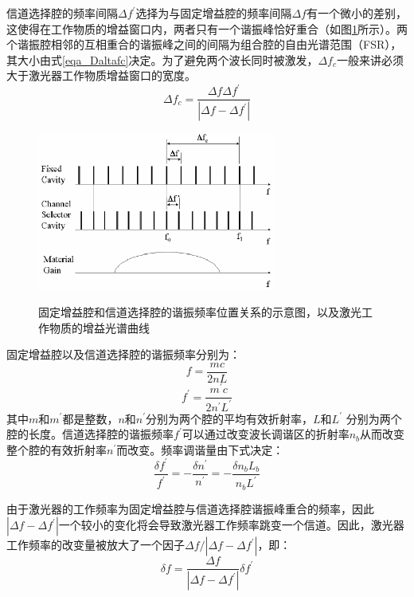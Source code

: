 \documentclass{ZJUthesis}
\begin{document}
信道选择腔的频率间隔$\Delta f ^\prime$选择为与固定增益腔的频率间隔$\Delta f$有一个微小的差别，这使得在工作物质的增益窗口内，两者只有一个谐振峰恰好重合（如图\ref{fig_Deltaf}所示）。两个谐振腔相邻的互相重合的谐振峰之间的间隔为组合腔的自由光谱范围（FSR），其大小由式\ref{eqa_Daltafc}决定。为了避免两个波长同时被激发，$\Delta f_c$一般来讲必须大于激光器工作物质增益窗口的宽度。
\begin{equation}\label{eqa_Daltafc}
  \Delta f_c = \frac{\Delta f \Delta f^\prime}{|\Delta f-\Delta f^\prime|}
\end{equation}
\begin{figure}[!htb]
  \centering
  \includegraphics[width=0.7\textwidth]{./Pictures/deltaf.eps}\\
  \caption{固定增益腔和信道选择腔的谐振频率位置关系的示意图，以及激光工作物质的增益光谱曲线}
  \label{fig_Deltaf}
\end{figure}

固定增益腔以及信道选择腔的谐振频率分别为：
\begin{equation}
  f = \frac{mc}{2nL}
\end{equation}
\begin{equation}
  f^\prime = \frac{m^\prime c}{2n^\prime L^\prime}
\end{equation}
其中$m$和$m^\prime$都是整数，$n$和$n^\prime$分别为两个腔的平均有效折射率，$L$和$L^\prime$ 分别为两个腔的长度。信道选择腔的谐振频率$f^\prime$可以通过改变波长调谐区的折射率$n_b$从而改变整个腔的有效折射率$n^\prime$而改变。频率调谐量由下式决定：
\begin{equation}
  \frac{\delta f^\prime}{f^\prime} = -\frac{\delta n^\prime}{n^\prime}=-\frac{\delta n_b L_b}{n_b L^\prime}
\end{equation}

由于激光器的工作频率为固定增益腔与信道选择腔谐振峰重合的频率，因此$|\Delta f-\Delta f^\prime|$一个较小的变化将会导致激光器工作频率跳变一个信道。因此，激光器工作频率的改变量被放大了一个因子$\Delta f/|\Delta f-\Delta f^\prime|$，即：
\begin{equation}
  \delta f = \frac{\Delta f}{|\Delta f-\Delta f^\prime|} \delta f^\prime
\end{equation}
\end{document}
